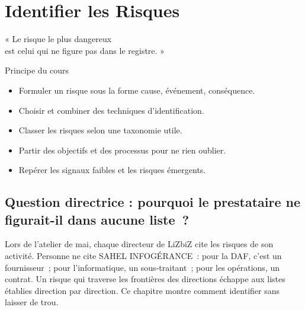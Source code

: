 
\chapter{Identifier les Risques}
\label{chap:identifier}

\epigraph{%
    « Le risque le plus dangereux\\
    est celui qui ne figure pas dans le registre. »%
}{Principe du cours}


\begin{boxobjectifs}
\begin{itemize}
    \item Formuler un risque sous la forme cause, événement, conséquence.
    \item Choisir et combiner des techniques d'identification.
    \item Classer les risques selon une taxonomie utile.
    \item Partir des objectifs et des processus pour ne rien oublier.
    \item Repérer les signaux faibles et les risques émergents.
\end{itemize}
\end{boxobjectifs}

\bigskip

\section*{Question directrice : pourquoi le prestataire ne figurait-il dans aucune liste~?}

Lors de l'atelier de mai, chaque directeur de LiZbiZ cite les risques de
son activité. Personne ne cite SAHEL INFOGÉRANCE~: pour la DAF, c'est un
fournisseur~; pour l'informatique, un sous-traitant~; pour les opérations,
un contrat. Un risque qui traverse les frontières des directions échappe
aux listes établies direction par direction. Ce chapitre montre comment
identifier sans laisser de trou.

